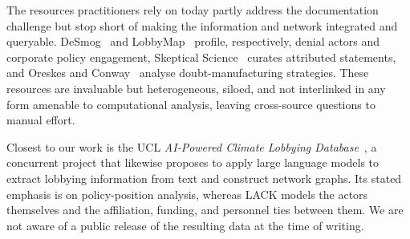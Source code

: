 \begin{sloppypar}
The resources practitioners rely on today partly address the documentation challenge but stop short of making the information and network integrated and queryable.
DeSmog~\cite{desmog} and LobbyMap~\cite{lobbymap} profile, respectively, denial actors and corporate policy engagement, Skeptical Science~\cite{skepticalscience} curates attributed statements, and Oreskes and Conway~\cite{oreskes2011merchants} analyse doubt-manufacturing strategies.
These resources are invaluable but heterogeneous, siloed, and not interlinked in any form amenable to computational analysis, leaving cross-source questions to manual effort.

Closest to our work is the UCL \emph{AI-Powered Climate Lobbying Database}~\cite{uclclimatelobbying}, a concurrent project that likewise proposes to apply large language models to extract lobbying information from text and construct network graphs.
Its stated emphasis is on policy-position analysis, whereas LACK models the actors themselves and the affiliation, funding, and personnel ties between them.
We are not aware of a public release of the resulting data at the time of writing.\end{sloppypar}

